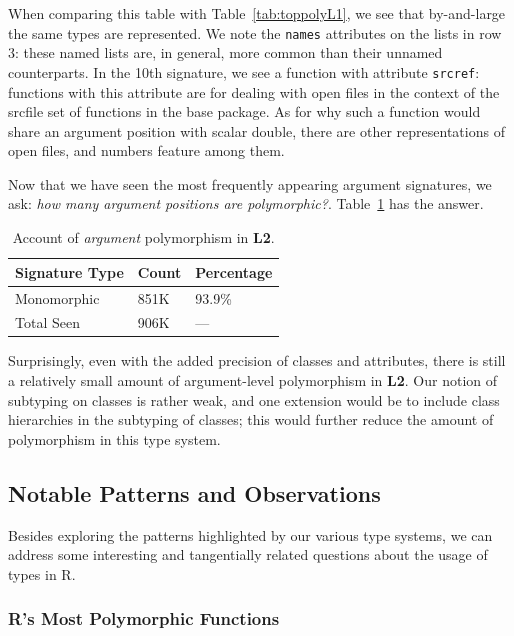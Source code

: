 \documentclass[acmsmall,10pt,review,anonymous]{acmart}\settopmatter{printfolios=true,printccs=false,printacmref=false}
\begin{document}
When comparing this table with Table~\ref{tab:toppolyL1}, we see that by-and-large the same types are represented.
We note the {\tt names} attributes on the lists in row 3: these named lists are, in general, more common than their unnamed counterparts.
In the 10th signature, we see a function with attribute {\tt srcref}: functions with this attribute are for dealing with open files in the context of the srcfile set of functions in the base package.
As for why such a function would share an argument position with scalar double, there are other representations of open files, and numbers feature among them.

Now that we have seen the most frequently appearing argument signatures, we ask: {\it how many argument positions are polymorphic?}.
Table~\ref{tab:argcountsL2} has the answer.

\begin{table}[ht]
\centering
\begin{tabular}{lll}
  \hline
Signature Type & Count & Percentage \\ 
  \hline
  Monomorphic & 851K & 93.9\% \\ 
  Total Seen & 906K & --- \\ 
   \hline
\end{tabular}
\caption{Account of {\it argument} polymorphism in {\bf L2}.}
\label{tab:argcountsL2}
\end{table}

Surprisingly, even with the added precision of classes and attributes, there is still a relatively small amount of argument-level polymorphism in {\bf L2}.
Our notion of subtyping on classes is rather weak, and one extension would be to include class hierarchies in the subtyping of classes;
this would further reduce the amount of polymorphism in this type system.

%
%
%
%
\subsection{Notable Patterns and Observations}

Besides exploring the patterns highlighted by our various type systems, we can address some interesting and tangentially related questions about the usage of types in R.

%
%
%
%
\subsubsection{R's Most Polymorphic Functions}
\end{document}
